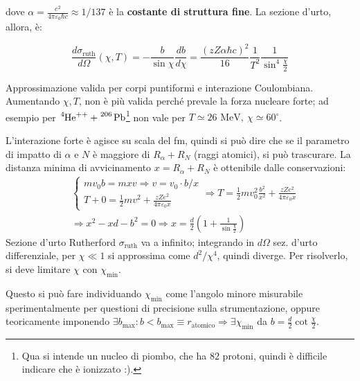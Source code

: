 \documentclass[10pt, a4paper]{scrartcl}
\numberwithin{equation}{subsection}
\theoremstyle{style1}
\newenvironment{boxenv}[1][]{
    \begin{eqbox}[#1]
    }{
   \end{eqbox}
}
\begin{document}
dove $\alpha  =\frac{e^2}{4\pi \varepsilon _0 \hbar c} \approx 1 / 137$ \`e la \textbf{costante di struttura fine}. La sezione d'urto, allora, \`e:
\begin{boxenv}[]
\begin{equation}
		\frac{d \sigma _\text{ruth}}{d\Omega  }(\chi  ,T)  = -\frac{b}{\sin \chi  } \frac{d b}{d \chi  } = \frac{(zZ \alpha \hbar c)^2}{16} \frac{1}{T^2} \frac{1}{\sin^4 \frac{\chi }{2}}
\end{equation}
\end{boxenv}
\noindent Approssimazione valida per corpi puntiformi e interazione Coulombiana. Aumentando $\chi  ,T$, non \`e pi\`u valida perch\'e prevale la forza nucleare forte; ad esempio per $\ce{^4He^{++} + ^{206} Pb}$\footnote{Qua si intende un nucleo di piombo, che ha $82$ protoni, quindi \`e difficile indicare che \`e ionizzato :).} non vale per $T\simeq 26 \text{ MeV}, \ \chi  \simeq 60 ^\circ$.

L'interazione forte \`e agisce su scala del fm, quindi si pu\`o dire che se il parametro di impatto di $\alpha $ e $N$ \`e maggiore di $R_\alpha + R_N$ (raggi atomici), si pu\`o trascurare. La distanza minima di avvicinamento $x = R_\alpha  + R_N$ \`e ottenibile dalle conservazioni:
\begin{equation}
	\begin{split}
		&\begin{cases}
		mv_0 b = m x v \Rightarrow v = v_0 \cdot  b / x\\
		T+0 = \frac{1}{2}m v^2 + \frac{zZ e^2 }{4\pi \varepsilon _0 x}
	\end{cases}\Rightarrow T = \frac{1}{2}mv_0^2 \frac{b^2}{x^2} + \frac{zZe^2}{4\pi \varepsilon _0 x} \\	
		&\Rightarrow x^2 - xd - b^2 =0 \Rightarrow x = \frac{d}{2}\left(1+ \frac{1}{\sin \frac{\chi }{2}}\right) 
	\end{split}
\end{equation}
Sezione d'urto Rutherford $\sigma _\text{ruth}$ va a infinito; integrando in $d\Omega $ sez. d'urto differenziale, per $\chi  \ll 1 $ si approssima come $d^2 / \chi  ^4$, quindi diverge. Per risolverlo, si deve limitare $\chi  $ con $\chi  _\text{min}$. 

Questo si pu\`o fare individuando $\chi  _\text{min}$ come l'angolo minore misurabile sperimentalmente per questioni di precisione sulla strumentazione, oppure teoricamente imponendo $\exists b_\text{max}: b< b_\text{max}\equiv r_\text{atomico}\Rightarrow \exists \chi  _\text{min}$ da $b = \frac{d}{2} \cot \frac{\chi 	}{2}$.
\end{document}
